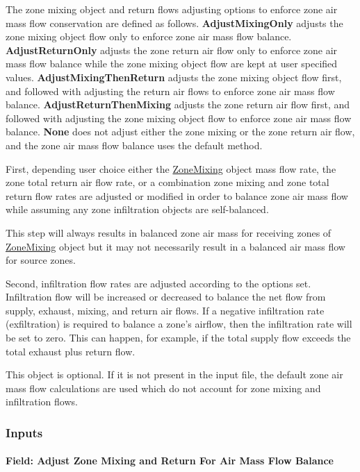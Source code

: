 The zone mixing object and return flows adjusting options to enforce zone air mass flow conservation are defined as follows. \textbf{AdjustMixingOnly} adjusts the zone mixing object flow only to enforce zone air mass flow balance. \textbf{AdjustReturnOnly} adjusts the zone return air flow only to enforce zone air mass flow balance while the zone mixing object flow are kept at user specified values. \textbf{AdjustMixingThenReturn} adjusts the zone mixing object flow first, and followed with adjusting the return air flows to enforce zone air mass flow balance. \textbf{AdjustReturnThenMixing} adjusts the zone return air flow first, and followed with adjusting the zone mixing object flow to enforce zone air mass flow balance. \textbf{None} does not adjust either the zone mixing or the zone return air flow, and the zone air mass flow balance uses the default method. 
 
First, depending user choice either the \hyperref[zonemixing]{ZoneMixing} object mass flow rate, the zone total return air flow rate, or a combination zone mixing and zone total return flow rates are adjusted or modified in order to balance zone air mass flow while assuming any zone infiltration objects are self-balanced. 

This step will always results in balanced zone air mass for receiving zones of \hyperref[zonemixing]{ZoneMixing} object but it may not necessarily result in a balanced air mass flow for source zones.~

Second, infiltration flow rates are adjusted according to the options set. Infiltration flow will be increased or decreased to balance the net flow from supply, exhaust, mixing, and return air flows. If a negative infiltration rate (exfiltration) is required to balance a zone's airflow, then the infiltration rate will be set to zero. This can happen, for example, if the total supply flow exceeds the total exhaust plus return flow.

This object is optional. If it is not present in the input file, the default zone air mass flow calculations are used which do not account for zone mixing and infiltration flows.

\subsubsection{Inputs}\label{inputs-9-002}

\paragraph{Field: Adjust Zone Mixing and Return For Air Mass Flow Balance}\label{field-adjust-zone-mixing-and-return-for-air-mass-flow-balance}

